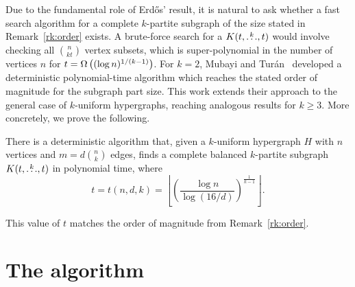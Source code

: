 Due to the fundamental role of Erd\H{o}s' result,
it is natural to ask whether a fast search algorithm for a complete $k$-partite subgraph of the size stated in Remark~\ref{rk:order} exists.
A brute-force search for a $K(t, \overset{k}{\dots}, t)$ would involve checking all $\binom{n}{kt}$ vertex subsets,
which is super-polynomial in the number of vertices $n$ for ${t = \Omega\left((\log n)^{1/(k-1)}\right)}$.
For $k=2$, Mubayi and Tur\'{a}n~\cite{MUBAYI2010174} developed a deterministic polynomial-time algorithm which reaches the stated order of magnitude for the subgraph part size.
This work extends their approach to the general case of $k$-uniform hypergraphs, reaching analogous results for $k \ge 3$.
More concretely, we prove the following.

\begin{theorem} \label{thm:main_theorem}
There is a deterministic algorithm that, given a $k$-uniform hypergraph $H$ with $n$ vertices and $m=d \binom{n}{k}$ edges, finds a complete balanced $k$-partite subgraph $K(t, \overset{k}{\dots}, t)$ in polynomial time, where
\[
    t = t(n, d, k) = \left\lfloor \left( \frac{\log n}{\log (16/d)}\right)^{\frac{1}{k-1}}\right\rfloor.
\]
\end{theorem}
This value of $t$ matches the order of magnitude from Remark~\ref{rk:order}.

\section{The algorithm}\label{sec:algorithm}

